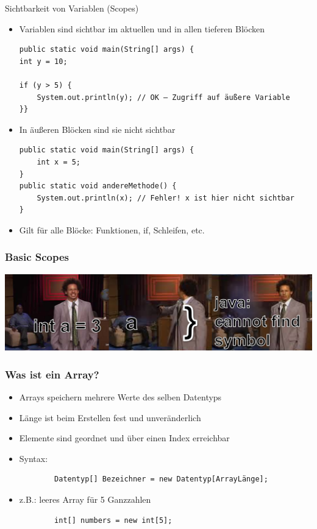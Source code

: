 \documentclass{../../presentation}
\begin{document}
\begin{frame}[fragile]{Sichtbarkeit von Variablen (Scopes)}
	\begin{itemize}
		\item\pause Variablen sind sichtbar im aktuellen und in allen tieferen Blöcken
		      \begin{verbatim}
public static void main(String[] args) {
int y = 10;

if (y > 5) {
    System.out.println(y); // OK – Zugriff auf äußere Variable
}}
    \end{verbatim}
		\item\pause In äußeren Blöcken sind sie nicht sichtbar
		      \begin{verbatim}
public static void main(String[] args) {
    int x = 5;
}
public static void andereMethode() {
    System.out.println(x); // Fehler! x ist hier nicht sichtbar
}
    \end{verbatim}

		\item\pause Gilt für alle Blöcke: Funktionen, if, Schleifen, etc.
	\end{itemize}
\end{frame}


\begin{frame}[fragile]
	\frametitle{Basic Scopes}
	\includegraphics[width=1\linewidth]{img/scopesmemehoriz.png}
\end{frame}


\begin{frame}[fragile]
	\frametitle{Was ist ein Array?}
	\begin{itemize}
		\item\pause Arrays speichern mehrere Werte des selben Datentyps
		\item\pause Länge ist beim Erstellen fest und unveränderlich
		\item\pause Elemente sind geordnet und über einen Index erreichbar
		\item\pause Syntax:
		      \begin{verbatim}
        Datentyp[] Bezeichner = new Datentyp[ArrayLänge];
    \end{verbatim}
		\item\pause z.B.: leeres Array für 5 Ganzzahlen
		      \begin{verbatim}
		int[] numbers = new int[5];
	\end{verbatim}
	\end{itemize}
\end{frame}
\end{document}
